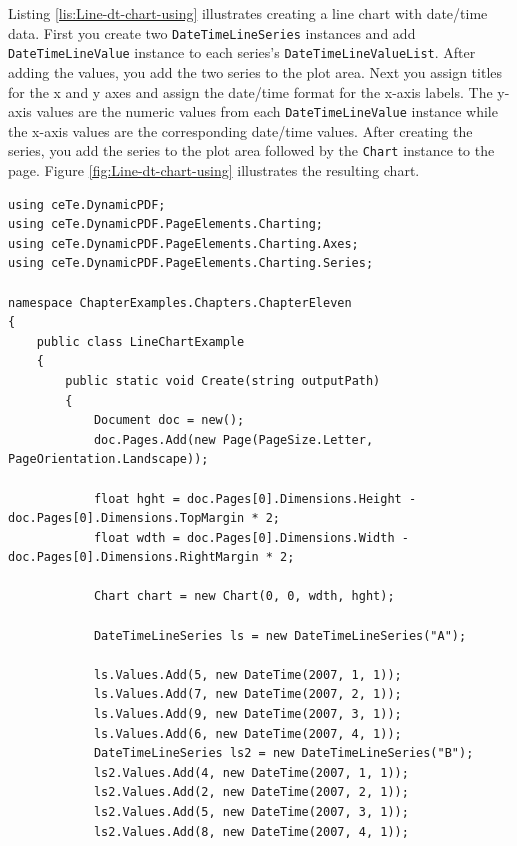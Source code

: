 \documentclass[american]{tufte-book}
\numberwithin{equation}{section}
\numberwithin{figure}{section}
\begin{document}
{Listing \ref{lis:Line-dt-chart-using} illustrates creating a line
chart with date/time data. First you create two \texttt{DateTimeLineSeries}
instances and add \texttt{DateTimeLineValue} instance to each series's
\texttt{DateTimeLineValueList}. After adding the values, you add the
two series to the plot area. Next you assign titles for the x and y
axes and assign the date/time format for the x-axis labels. The y-axis
values are the numeric values from each \texttt{DateTimeLineValue}
instance while the x-axis values are the corresponding date/time values.
After creating the series, you add the series to the plot area followed
by the \texttt{Chart} instance to the page. Figure \ref{fig:Line-dt-chart-using}
illustrates the resulting chart. 

\bgroup{}
\begin{lstlisting}[caption={Line chart using date/time data.},label={lis:Line-dt-chart-using},basicstyle={\footnotesize\ttfamily},breaklines=true]
using ceTe.DynamicPDF;
using ceTe.DynamicPDF.PageElements.Charting;
using ceTe.DynamicPDF.PageElements.Charting.Axes;
using ceTe.DynamicPDF.PageElements.Charting.Series;

namespace ChapterExamples.Chapters.ChapterEleven
{
    public class LineChartExample
    {
        public static void Create(string outputPath)
        {
            Document doc = new();
            doc.Pages.Add(new Page(PageSize.Letter, PageOrientation.Landscape));

            float hght = doc.Pages[0].Dimensions.Height - doc.Pages[0].Dimensions.TopMargin * 2;
            float wdth = doc.Pages[0].Dimensions.Width - doc.Pages[0].Dimensions.RightMargin * 2;

            Chart chart = new Chart(0, 0, wdth, hght);

            DateTimeLineSeries ls = new DateTimeLineSeries("A");

            ls.Values.Add(5, new DateTime(2007, 1, 1));
            ls.Values.Add(7, new DateTime(2007, 2, 1));
            ls.Values.Add(9, new DateTime(2007, 3, 1));
            ls.Values.Add(6, new DateTime(2007, 4, 1));
            DateTimeLineSeries ls2 = new DateTimeLineSeries("B");
            ls2.Values.Add(4, new DateTime(2007, 1, 1));
            ls2.Values.Add(2, new DateTime(2007, 2, 1));
            ls2.Values.Add(5, new DateTime(2007, 3, 1));
            ls2.Values.Add(8, new DateTime(2007, 4, 1));
           

\end{lstlisting}}
\end{document}
